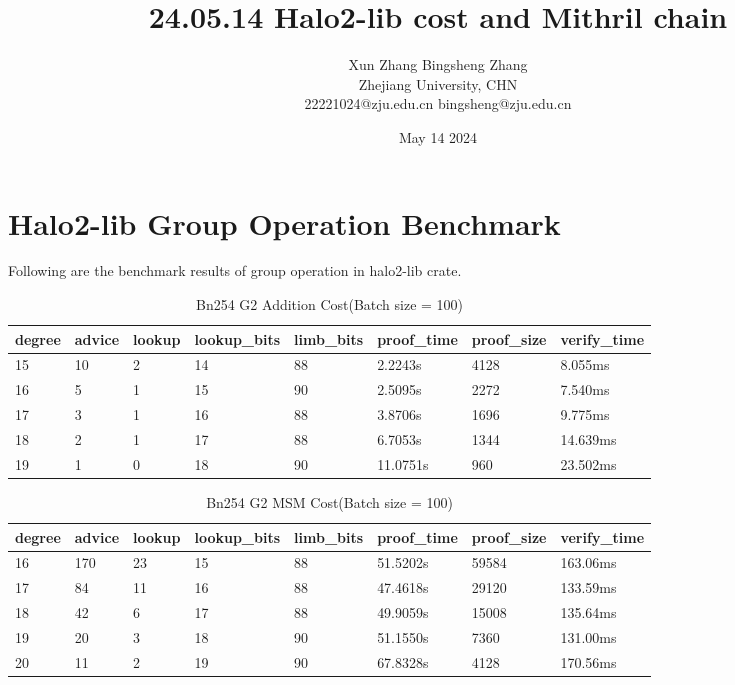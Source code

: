 \documentclass{article}
\title{24.05.14 Halo2-lib cost and Mithril chain}
\author{Xun Zhang \quad \quad Bingsheng Zhang \\ 
Zhejiang University, CHN \\
22221024@zju.edu.cn \quad bingsheng@zju.edu.cn}
\date{May 14 2024}
\begin{document}
\maketitle

\section{Halo2-lib Group Operation Benchmark}

Following are the benchmark results of group operation in halo2-lib crate.

\begin{table}[H]
    \centering
    \begin{tabular}{p{1cm}|p{1cm}|p{1cm}|p{2cm}|p{1.5cm}|p{1.5cm}|p{1.5cm}|p{1.5cm}} \hline
          degree&advice&lookup&lookup\_bits&limb\_bits&proof\_time&proof\_size&verify\_time \\ \hline
15&10&2&14&88&2.2243s&4128&8.055ms \\ \hline
16&5&1&15&90&2.5095s&2272&7.540ms\\ \hline
17&3&1&16&88&3.8706s&1696&9.775ms\\ \hline
18&2&1&17&88&6.7053s&1344&14.639ms\\ \hline
19&1&0&18&90&11.0751s&960&23.502ms\\ \hline

         
    \end{tabular}
    \caption{Bn254 G2 Addition Cost(Batch size = 100)}
    \label{tab:my_label}
\end{table}


\begin{table}[H]
    \centering
    \begin{tabular}{p{1cm}|p{1cm}|p{1cm}|p{2cm}|p{1.5cm}|p{1.5cm}|p{1.5cm}|p{1.5cm}} \hline
          degree&advice&lookup&lookup\_bits&limb\_bits&proof\_time&proof\_size&verify\_time \\ \hline
16&170&23&15&88&51.5202s&59584&163.06ms \\ \hline
17&84&11&16&88&47.4618s&29120&133.59ms\\ \hline
18&42&6&17&88&49.9059s&15008&135.64ms\\ \hline
19&20&3&18&90&51.1550s&7360&131.00ms\\ \hline
20&11&2&19&90&67.8328s&4128&170.56ms\\ \hline

         
    \end{tabular}
    \caption{Bn254 G2 MSM Cost(Batch size = 100)}
    \label{tab:my_label}
\end{table}
\end{document}
